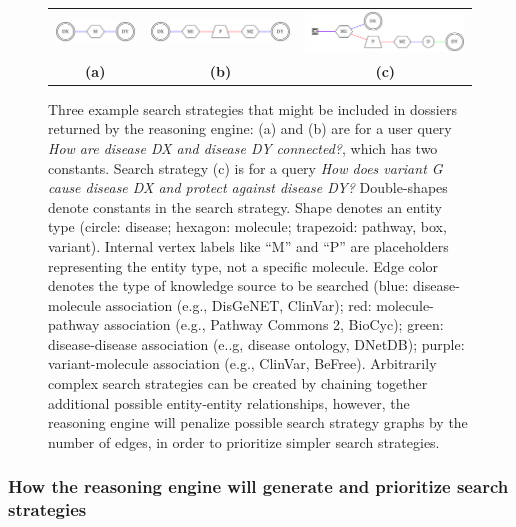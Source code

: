 \documentclass[11pt,notitlepage]{article}
\begin{document}
\begin{figure}[h!]
  \begin{tabular}{ccc}
    \includegraphics[width=1.2in]{net6.png} &
    \includegraphics[width=2.2in]{net7.png} & 
    \includegraphics[width=2.5in]{net8.png} \\
                    {\bf (a)} & {\bf (b)} & {\bf (c)}
                    \end{tabular}
  \caption{Three example search strategies that might be included in dossiers
    returned by the reasoning engine: (a) and (b) are for a user query {\em How
      are disease DX and disease DY connected?\/}, which has two constants.
    Search strategy (c) is for a query {\em How does variant G cause disease DX
      and protect against disease DY?}  Double-shapes denote constants in the
    search strategy. Shape denotes an entity type (circle: disease; hexagon:
    molecule; trapezoid: pathway, box, variant). Internal vertex labels like
    ``M'' and ``P'' are placeholders representing the entity type, not a
    specific molecule. Edge color denotes the type of knowledge source to be
    searched (blue: disease-molecule association (e.g., DisGeNET, ClinVar); red:
    molecule-pathway association (e.g., Pathway Commons 2, BioCyc); green:
    disease-disease association (e..g, disease ontology, DNetDB); purple:
    variant-molecule association (e.g., ClinVar, BeFree). Arbitrarily complex
    search strategies can be created by chaining together additional possible
    entity-entity relationships, however, the reasoning engine will penalize
    possible search strategy graphs by the number of edges, in order to
    prioritize simpler search strategies.}
  \label{fig:ugraph}
\end{figure}

\subsubsection{How the reasoning engine will generate and prioritize search
  strategies}
\end{document}
